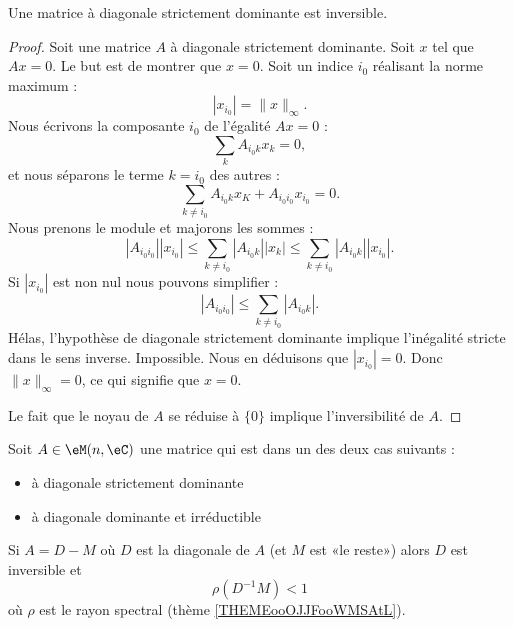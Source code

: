 \begin{proposition}
    Une matrice à diagonale strictement dominante est inversible.
\end{proposition}

\begin{proof}
    Soit une matrice \( A\) à diagonale strictement dominante. Soit \( x\) tel que \( Ax=0\). Le but est de montrer que \( x=0\). Soit un indice \( i_0\) réalisant la norme maximum :
    \begin{equation}
        | x_{i_0} |=\| x \|_{\infty}.
    \end{equation}
    Nous écrivons la composante \( i_0\) de l'égalité \( Ax=0\) : 
    \begin{equation}
        \sum_kA_{i_0k}x_k=0,
    \end{equation}
    et nous séparons le terme \( k=i_0\) des autres :
    \begin{equation}
        \sum_{k\neq i_0}A_{i_0k}x_K+A_{i_0i_0}x_{i_0}=0.
    \end{equation}
    Nous prenons le module et majorons les sommes :
    \begin{equation}
        | A_{i_0i_0} | |x_{i_0} |\leq \sum_{k\neq i_0}| A_{i_0k} | |x_k |\leq \sum_{k\neq i_0}| A_{i_0k} | |x_{i_0} |.
    \end{equation}
    Si \( | x_{i_0} | \) est non nul nous pouvons simplifier :
    \begin{equation}
        | A_{i_0i_0} |\leq \sum_{k\neq i_0}| A_{i_0k} |.
    \end{equation}
    Hélas, l'hypothèse de diagonale strictement dominante implique l'inégalité stricte dans le sens inverse. Impossible. Nous en déduisons que \( | x_{i_0} |=0\). Donc \( \| x \|_{\infty}=0\), ce qui signifie que \( x=0\).

    Le fait que le noyau de \( A\) se réduise à \( \{ 0 \}\) implique l'inversibilité de \( A\).
\end{proof}

\begin{proposition}     \label{PROPooTQWUooSLoniQ}
    Soit \( A\in \eM(n,\eC)\) une matrice qui est dans un des deux cas suivants :
    \begin{itemize}
        \item à diagonale strictement dominante
        \item à diagonale dominante et irréductible
    \end{itemize}
    Si \( A=D-M\) où \( D\) est la diagonale de \( A\) (et \( M\) est «le reste») alors \( D\) est inversible et
    \begin{equation}
        \rho(D^{-1}M)<1
    \end{equation}
    où \( \rho\) est le rayon spectral (thème \ref{THEMEooOJJFooWMSAtL}).
\end{proposition}

